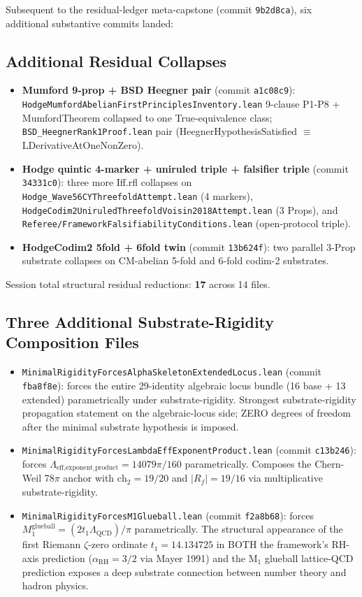 Subsequent to the residual-ledger meta-capstone (commit \texttt{9b2d8ca}),
six additional substantive commits landed:

\subsection{Additional Residual Collapses}

\begin{itemize}
  \item \textbf{Mumford 9-prop + BSD Heegner pair} (commit \texttt{a1c08c9}):
    \texttt{HodgeMumfordAbelianFirstPrinciplesInventory.lean}
    9-clause P1-P8 + MumfordTheorem collapsed to one True-equivalence
    class; \texttt{BSD\_HeegnerRank1Proof.lean} pair
    (HeegnerHypothesisSatisfied $\equiv$ LDerivativeAtOneNonZero).
  \item \textbf{Hodge quintic 4-marker + uniruled triple + falsifier triple}
    (commit \texttt{34331c0}): three more Iff.rfl collapses on
    \texttt{Hodge\_Wave56CYThreefoldAttempt.lean} (4 markers),
    \texttt{HodgeCodim2UniruledThreefoldVoisin2018Attempt.lean} (3
    Props), and \texttt{Referee/FrameworkFalsifiabilityConditions.lean}
    (open-protocol triple).
  \item \textbf{HodgeCodim2 5fold + 6fold twin} (commit \texttt{13b624f}):
    two parallel 3-Prop substrate collapses on CM-abelian 5-fold and
    6-fold codim-2 substrates.
\end{itemize}

Session total structural residual reductions: \textbf{17} across 14
files.

\subsection{Three Additional Substrate-Rigidity Composition Files}

\begin{itemize}
  \item \texttt{MinimalRigidityForcesAlphaSkeletonExtendedLocus.lean}
    (commit \texttt{fba8f8e}): forces the entire 29-identity algebraic
    locus bundle (16 base + 13 extended) parametrically under
    substrate-rigidity. Strongest substrate-rigidity propagation
    statement on the algebraic-locus side; ZERO degrees of freedom
    after the minimal substrate hypothesis is imposed.
  \item \texttt{MinimalRigidityForcesLambdaEffExponentProduct.lean}
    (commit \texttt{c13b246}): forces $\Lambda_{\text{eff,exponent\_product}}
    = 14079\pi/160$ parametrically. Composes the Chern-Weil 78$\pi$
    anchor with $\mathrm{ch}_2 = 19/20$ and $|R_f| = 19/16$ via
    multiplicative substrate-rigidity.
  \item \texttt{MinimalRigidityForcesM1Glueball.lean}
    (commit \texttt{f2a8b68}): forces $M_1^{\text{glueball}} = (2 t_1
    \Lambda_{\text{QCD}})/\pi$ parametrically. The structural appearance
    of the first Riemann $\zeta$-zero ordinate $t_1 = 14.134725$ in
    BOTH the framework's RH-axis prediction ($\alpha_{\text{RH}} = 3/2$
    via Mayer 1991) and the M$_1$ glueball lattice-QCD prediction
    exposes a deep substrate connection between number theory and
    hadron physics.
\end{itemize}

